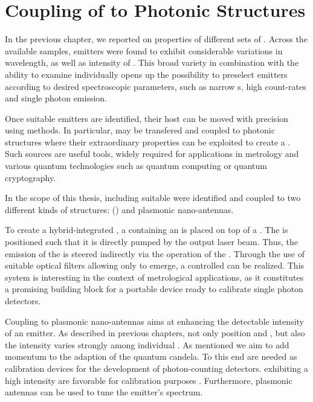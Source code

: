 
\chapter{Coupling of \Nds to Photonic Structures}	\label{ch::coupling}

	In the previous chapter, we reported on \pl properties of different sets of \sivs.
	Across the available samples, emitters were found to exhibit considerable variations in wavelength, \lw as well as intensity of \zpls.
	This broad variety in combination with the ability to examine \sivs individually opens up the possibility to preselect emitters according to desired spectroscopic parameters, such as narrow \lw{}s, high count-rates and single photon emission.

	Once suitable emitters are identified, their host \nds can be moved with precision using \pp methods.
	In particular, \sivs may be transfered and coupled to photonic structures where their extraordinary properties can be exploited to create a \sps.
	Such sources are useful tools, widely required for applications in metrology and various quantum technologies such as quantum computing or quantum cryptography.

	In the scope of this thesis, \nds including suitable \sivs were identified and coupled to two different kinds of structures: \Vcsels (\VCSELs) and plasmonic nano-antennas.

	To create a hybrid-integrated \sps, a \nd containing an \siv is placed on top of a \VCSEL. The \siv is positioned such that it is directly pumped by the \VCSEL output laser beam. Thus, the emission of the \siv is steered indirectly via the operation of the \VCSEL. Through the use of suitable optical filters allowing only \siv \fl to emerge, a controlled \sps can be realized. This system is interesting in the context of metrological applications, as it constitutes a promising building block for a portable device ready to calibrate single photon detectors.

	Coupling \sivs to plasmonic nano-antennas aims at enhancing the detectable \pl intensity of an emitter.
	As described in previous chapters, not only \ZPL position and \lw, but also the \pl intensity varies strongly among individual \sivs.
	As mentioned we aim to add momentum to the adaption of the quantum candela. To this end \spss are needed as calibration devices for the development of photon-counting detectors. \Spss exhibiting a high intensity are favorable for calibration purposes \cite{Vaigu2017}. Furthermore, plasmonic antennas can be used to tune the emitter's \pl spectrum.



